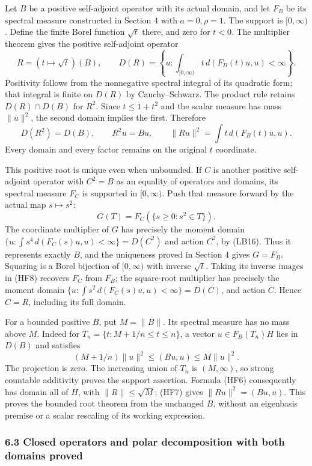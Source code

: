 \documentclass[
  11pt,
]{article}
\begin{document}
Let \(B\) be a positive self-adjoint operator with its actual domain,
and let \(F_B\) be its spectral measure constructed in Section 4 with
\(a=0,\rho=1\). The support is \([0,\infty)\). Define the finite Borel
function \(\sqrt t\) there, and zero for \(t<0\). The multiplier theorem
gives the positive self-adjoint operator \[
 R=(t\mapsto\sqrt t)(B),\qquad
 D(R)=\left\{u:\int_{[0,\infty)}t\,d(F_B(t)u,u)<\infty\right\}.
 \tag{HF6}
\] Positivity follows from the nonnegative spectral integral of its
quadratic form; that integral is finite on \(D(R)\) by Cauchy--Schwarz.
The product rule retains \(D(R)\cap D(B)\) for \(R^2\). Since
\(t\leq1+t^2\) and the scalar measure has mass \(\|u\|^2\), the second
domain implies the first. Therefore \[
 D(R^2)=D(B),\qquad R^2u=Bu,\qquad
 \|Ru\|^2=\int t\,d(F_B(t)u,u).
 \tag{HF7}
\] Every domain and every factor remains on the original \(t\)
coordinate.

This positive root is unique even when unbounded. If \(C\) is another
positive self-adjoint operator with \(C^2=B\) as an equality of
operators and domains, its spectral measure \(F_C\) is supported in
\([0,\infty)\). Push that measure forward by the actual map
\(s\mapsto s^2\): \[
 G(T)=F_C(\{s\geq0:s^2\in T\}).
 \tag{HF8}
\] The coordinate multiplier of \(G\) has precisely the moment domain
\(\{u:\int s^4\,d(F_C(s)u,u)<\infty\}=D(C^2)\) and action \(C^2\), by
(LB16). Thus it represents exactly \(B\), and the uniqueness proved in
Section 4 gives \(G=F_B\). Squaring is a Borel bijection of
\([0,\infty)\) with inverse \(\sqrt t\). Taking its inverse images in
(HF8) recovers \(F_C\) from \(F_B\); the square-root multiplier has
precisely the moment domain
\(\{u:\int s^2\,d(F_C(s)u,u)<\infty\}=D(C)\), and action \(C\). Hence
\(C=R\), including its full domain.

For a bounded positive \(B\), put \(M=\|B\|\). Its spectral measure has
no mass above \(M\). Indeed for \(T_n=\{t:M+1/n\leq t\leq n\}\), a
vector \(u\in F_B(T_n)H\) lies in \(D(B)\) and satisfies \[
 (M+1/n)\|u\|^2
 \leq(Bu,u)\leq M\|u\|^2.
 \tag{HF9}
\] The projection is zero. The increasing union of \(T_n\) is
\((M,\infty)\), so strong countable additivity proves the support
assertion. Formula (HF6) consequently has domain all of \(H\), with
\(\|R\|\leq\sqrt M\); (HF7) gives \(\|Ru\|^2=(Bu,u)\). This proves the
bounded root theorem from the unchanged \(B\), without an eigenbasis
premise or a scalar rescaling of its working expression.

\subsubsection{6.3 Closed operators and polar decomposition with both
domains
proved}\label{closed-operators-and-polar-decomposition-with-both-domains-proved}
\end{document}
